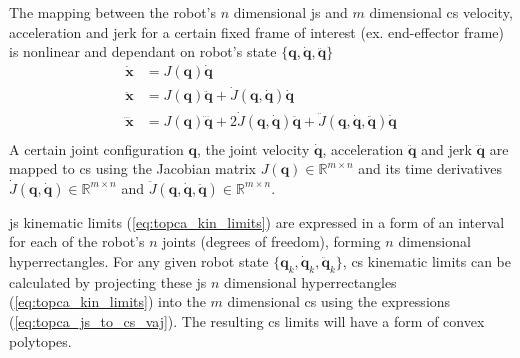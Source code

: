 The mapping between the robot's $n$ dimensional \gls{js} and $m$ dimensional \gls{cs} velocity, acceleration and jerk for a certain fixed frame of interest (ex. end-effector frame) is nonlinear and dependant on robot's state $\{\bm{q},\dot{\bm{q}},\ddot{\bm{q}}\}$ 
\begin{equation}
\begin{split}
\dot{\bm{x}}&= J(\bm{q})\dot{\bm{q}}\\
\ddot{\bm{x}}&= J(\bm{q})\ddot{\bm{q}} + \dot{J}(\bm{q},\dot{\bm{q}})\dot{\bm{q}}\\
\dddot{\bm{x}}&= J(\bm{q})\dddot{\bm{q}} + 2\dot{J}(\bm{q},\dot{\bm{q}})\ddot{\bm{q}} + \ddot{J}(\bm{q},\dot{\bm{q}},\ddot{\bm{q}})\dot{\bm{q}}\\
 \end{split} \label{eq:topca_js_to_cs_vaj}
\end{equation}
A certain joint configuration $\bm{q}$, the joint velocity $\dot{\bm{q}}$, acceleration $\ddot{\bm{q}}$ and jerk $\dddot{\bm{q}}$ are mapped to \gls{cs} using the Jacobian matrix $J(\bm{q})\in\mathbb{R}^{m\times n}$ and its time derivatives $\dot{J}(\bm{q},\dot{\bm{q}})\in\mathbb{R}^{m\times n}$ and  $\ddot{J}(\bm{q},\dot{\bm{q}},\ddot{\bm{q}})\in\mathbb{R}^{m\times n}$. 


\gls{js} kinematic limits (\ref{eq:topca_kin_limits}) are expressed in a form of an interval for each of the robot's $n$ joints (degrees of freedom), forming $n$ dimensional hyperrectangles. For any given robot state $\{\bm{q}_k,\dot{\bm{q}}_k,\ddot{\bm{q}}_k\}$, \gls{cs} kinematic limits can be calculated by projecting these \gls{js} $n$ dimensional hyperrectangles (\ref{eq:topca_kin_limits}) into the $m$ dimensional \gls{cs} using the expressions (\ref{eq:topca_js_to_cs_vaj}). The resulting \gls{cs} limits will have a form of convex polytopes. 


